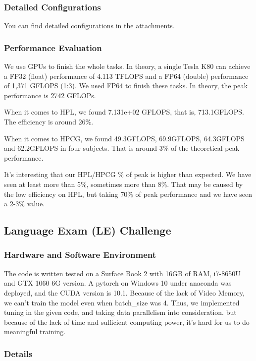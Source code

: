 \documentclass[a4paper, 11pt]{article}
\begin{document}
		\subsubsection{Detailed Configurations} You can find detailed configurations in the attachments.
		\subsubsection{Performance Evaluation} 
			We use GPUs to finish the whole tasks. In theory, a single Tesla K80 can achieve a FP32 (float) performance of 4.113 TFLOPS and a FP64 (double) performance of 1,371 GFLOPS (1:3). We used FP64 to finish these tasks. In theory, the peak performance is 2742 GFLOPs. 
			
			When it comes to HPL, we found 7.131e+02 GFLOPS, that is, 713.1GFLOPS. The efficiency is around 26\%.
			
			When it comes to HPCG\cite{luszczek2006hpc}, we found 49.3GFLOPS, 69.9GFLOPS, 64.3GFLOPS and 62.2GFLOPS in four subjects. That is around 3\% of the theoretical peak performance.
			
			It's interesting that our HPL/HPCG \% of peak is higher than expected. We have seen at least more than 5\%, sometimes more than 8\%. That may be caused by the low efficiency on HPL, but taking 70\% of peak performance and we have seen a 2-3\% value.
		
		
		
		
		
		
		
		
		\subsection{Language Exam (LE) Challenge}
			\subsubsection{Hardware and Software Environment}
			
				The code is written tested on a Surface Book 2 with 16GB of RAM, i7-8650U and GTX 1060 6G version. A pytorch on Windows 10 under anaconda was deployed, and the CUDA version is 10.1. 
				Because of the lack of Video Memory, we can't train the model even when batch\_size was 4. Thus, we implemented tuning in the given code, and taking data parallelism into consideration. but because of the lack of time and sufficient computing power, it's hard for us to do meaningful training.
				
			\subsubsection{Details}
			
\end{document}
